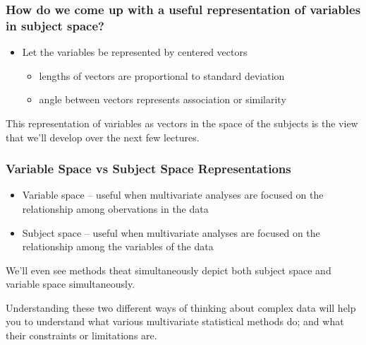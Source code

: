 \documentclass{beamer}
\begin{document}
\begin{frame}
\frametitle{How do we come up with a useful representation of variables in subject space?}

\begin{itemize}
 \item Let the variables be represented by centered vectors
 \begin{itemize}
    \item lengths of vectors are proportional to standard deviation
    \item angle between vectors represents association or similarity
 \end{itemize}
\end{itemize}

\begin{center}

\end{center}

This representation of variables as vectors in the space of the subjects is the view that we'll develop over the next few lectures.


\end{frame}

\begin{frame}
  \frametitle{Variable Space vs Subject Space Representations}

  \begin{itemize}
  \item Variable space -- useful when multivariate analyses are focused on the relationship among obervations in the data
    \item Subject space -- useful when multivariate analyses are focused on the relationship among the variables of the data
  \end{itemize}

  \bigskip

  We'll even see methods theat simultaneously depict both subject space and variable space simultaneously.

  \medskip

 Understanding these two different ways of thinking about complex data will help you to understand what various multivariate statistical methods do; and what their constraints or limitations are. 

\end{frame}
\end{document}
